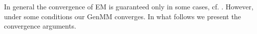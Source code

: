 {In general the convergence of EM is guaranteed only in some cases, cf. \cite{wu1983convergence}. However, under some conditions our GenMM converges. In what follows we present the convergence arguments. 
}

